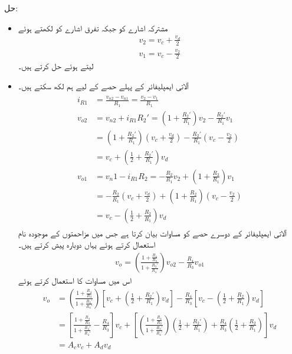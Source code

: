 حل:
\begin{itemize}
\item
مشترکہ اشارے کو  جبکہ تفرق اشارے کو  لکھتے ہوئے
\begin{align*}
v_2=v_c+\frac{v_d}{2}\\
v_1=v_c-\frac{v_2}{2}
\end{align*}
لیتے ہوئے حل کرتے ہیں۔ 
\item
آلاتی ایمپلیفائر کے پہلے حصے کے لیے ہم لکھ سکتے ہیں۔
\begin{gather}
\begin{aligned}\label{مساوات_آلاتی_پہلا_حصہ}
i_{R1}&=\frac{v_{n2}-v_{n1}}{R_1}=\frac{v_2-v_1}{R_1}\\
v_{o2}&=v_{n2}+i_{R1} R_2'=\left(1+\frac{R_2'}{R_1} \right) v_2-\frac{R_2'}{R_1} v_1\\
&=\left(1+\frac{R_2'}{R_1} \right) \left(v_c+\frac{v_d}{2} \right)-\frac{R_2'}{R_1} \left(v_c-\frac{v_2}{2} \right)\\
&=v_c+\left(\frac{1}{2}+\frac{R_2'}{R_1}\right) v_d\\
v_{o1}&=v_n1-i_{R1} R_2=-\frac{R_2}{R_1} v_2+\left(1+\frac{R_2}{R_1} \right) v_1\\
&=-\frac{R_2}{R_1} \left(v_c+\frac{v_d}{2} \right)+\left(1+\frac{R_2}{R_1} \right) \left(v_c-\frac{v_2}{2}\right)\\
&=v_c-\left(\frac{1}{2}+\frac{R_2}{R_1} \right) v_d
\end{aligned}
\end{gather}
آلاتی ایمپلیفائر کے دوسرے حصے کو مساوات  بیان کرتا ہے جس  میں مزاحمتوں کے موجودہ نام استعمال کرتے ہوئے یہاں دوبارہ پیش کرتے ہیں۔
\begin{align*}
v_o=\left(\frac{1+\frac{R_4}{R_3}}{1+\frac{R_3'}{R_4'}} \right) v_{o2}-\frac{R_4}{R_3}v_{o1}
\end{align*}
اس میں مساوات  کا استعمال کرتے ہوئے
\begin{align*}
v_o&=\left(\frac{1+\frac{R_4}{R_3}}{1+\frac{R_3'}{R_4'}} \right) \left[v_c+\left(\frac{1}{2}+\frac{R_2'}{R_1}\right) v_d \right]-\frac{R_4}{R_3}\left[ v_c-\left(\frac{1}{2}+\frac{R_2}{R_1} \right) v_d\right]\\
&=\left[\frac{1+\frac{R_4}{R_3}}{1+\frac{R_3'}{R_4'}} -\frac{R_4}{R_3} \right] v_c +\left[\left(\frac{1+\frac{R_4}{R_3}}{1+\frac{R_3'}{R_4'}} \right)\left(\frac{1}{2}+\frac{R_2'}{R_1} \right) +\frac{R_4 }{R_3 }\left(\frac{1}{2}+\frac{R_2}{R_1} \right)\right]v_d\\
&=A_c v_c +A_d v_d
\end{align*}

\end{itemize}
